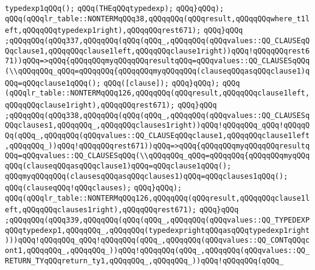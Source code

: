 \verb|typedexp1qQQq();|\newline
\verb|qQQq(THEqQQqtypedexp);|\newline
\verb|qQQq}qQQq);|\newline
\verb|qQQq(qQQqlr_table::NONTERMqQQq38,qQQqqQQq(qQQqresult,qQQqqQQqwhere_t1left,qQQqqQQqtypedexp1right),qQQqqQQqrest671);|\newline
\verb|qQQq}qQQq|\newline
\verb|;qQQqqQQq(qQQq337,qQQqqQQq(qQQq(qQQq_,qQQqqQQq(qQQqvalues::QQ_CLAUSEqQQqclause1,qQQqqQQqclause1left,qQQqqQQqclause1right))qQQq!qQQqqQQqrest671))qQQq=>qQQq{qQQqqQQqmyqQQqqQQqresultqQQq=qQQqvalues::QQ_CLAUSESqQQq(\\qQQqqQQq_qQQq=qQQqqQQq{qQQqqQQqmyqQQqqQQq(clauseqQQqasqQQqclause1)qQQq=qQQqclause1qQQq();|\newline
\verb|qQQq([clause]);|\newline
\verb|qQQq}qQQq);|\newline
\verb|qQQq|\newline
\verb|(qQQqlr_table::NONTERMqQQq126,qQQqqQQq(qQQqresult,qQQqqQQqclause1left,qQQqqQQqclause1right),qQQqqQQqrest671);|\newline
\verb|qQQq}qQQq|\newline
\verb|;qQQqqQQq(qQQq338,qQQqqQQq(qQQq(qQQq_,qQQqqQQq(qQQqvalues::QQ_CLAUSESqQQqclauses1,qQQqqQQq_,qQQqqQQqclauses1right))qQQq!qQQqqQQq_qQQq!qQQqqQQq(qQQq_,qQQqqQQq(qQQqvalues::QQ_CLAUSEqQQqclause1,qQQqqQQqclause1left,qQQqqQQq_))qQQq!qQQqqQQqrest671))qQQq=>qQQq{qQQqqQQqmyqQQqqQQqresultqQQq=qQQqvalues::QQ_CLAUSESqQQq(\\qQQqqQQq_qQQq=qQQqqQQq{qQQqqQQqmyqQQq|\newline
\verb|qQQq(clauseqQQqasqQQqclause1)qQQq=qQQqclause1qQQq();|\newline
\verb|qQQqmyqQQqqQQq(clausesqQQqasqQQqclauses1)qQQq=qQQqclauses1qQQq();|\newline
\verb|qQQq(clauseqQQq!qQQqclauses);|\newline
\verb|qQQq}qQQq);|\newline
\verb|qQQq(qQQqlr_table::NONTERMqQQq126,qQQqqQQq(qQQqresult,qQQqqQQqclause1left,qQQqqQQqclauses1right),qQQqqQQqrest671);|\newline
\verb|qQQq}qQQq|\newline
\verb|;qQQqqQQq(qQQq339,qQQqqQQq(qQQq(qQQq_,qQQqqQQq(qQQqvalues::QQ_TYPEDEXPqQQqtypedexp1,qQQqqQQq_,qQQqqQQq(typedexprightqQQqasqQQqtypedexp1right)))qQQq!qQQqqQQq_qQQq!qQQqqQQq(qQQq_,qQQqqQQq(qQQqvalues::QQ_CONTqQQqcont1,qQQqqQQq_,qQQqqQQq_))qQQq!qQQqqQQq(qQQq_,qQQqqQQq(qQQqvalues::QQ_RETURN_TYqQQqreturn_ty1,qQQqqQQq_,qQQqqQQq_))qQQq!qQQqqQQq(qQQq_|\newline
